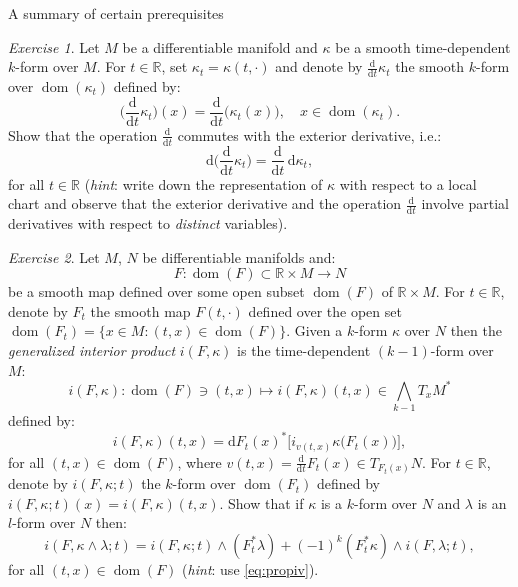 \documentclass[oneside,a4paper,11pt]{amsbook}
\newcommand{\R}{\mathds R}
\newcommand{\dd}{\mathrm d}
\DeclareMathOperator{\Dom}{dom}
\theoremstyle{remark}\newtheorem{exercise}{Exercise}[chapter]
\theoremstyle{plain}\newtheorem{teo}{Theorem}[section]
\theoremstyle{plain}\newtheorem{lem}[teo]{Lemma}
\theoremstyle{plain}\newtheorem{prop}[teo]{Proposition}
\theoremstyle{plain}\newtheorem{cor}[teo]{Corollary}
\theoremstyle{definition}\newtheorem{defin}[teo]{Definition}
\theoremstyle{remark}\newtheorem{rem}[teo]{Remark}
\theoremstyle{definition}\newtheorem{notation}[teo]{Notation}
\theoremstyle{definition}\newtheorem{convention}[teo]{Convention}
\theoremstyle{definition}\newtheorem{example}[teo]{Example}
\numberwithin{section}{chapter}
\numberwithin{equation}{section}
\begin{document}
\begin{chapter}{A summary of certain prerequisites}
\begin{exercise}\label{exe:timedepdiff}
Let $M$ be a differentiable manifold and $\kappa$ be a smooth time-dependent $k$-form over $M$. For $t\in\R$, set $\kappa_t=\kappa(t,\cdot)$
and denote by $\frac{\dd}{\dd t}\kappa_t$ the smooth $k$-form over $\Dom(\kappa_t)$ defined by:
\[\Big(\frac{\dd}{\dd t}\kappa_t\Big)(x)=\frac{\dd}{\dd t}\big(\kappa_t(x)\big),\quad x\in\Dom(\kappa_t).\]
Show that the operation $\frac{\dd}{\dd t}$ commutes with the exterior derivative, i.e.:
\[\dd\Big(\frac{\dd}{\dd t}\kappa_t\Big)=\frac{\dd}{\dd t}\,\dd\kappa_t,\]
for all $t\in\R$ ({\em hint}: write down the representation of $\kappa$ with respect to a local chart and observe
that the exterior derivative and the operation $\frac{\dd}{\dd t}$ involve partial derivatives with respect to {\em distinct\/}
variables).
\end{exercise}

\begin{exercise}\label{exe:genintprod}
Let $M$, $N$ be differentiable manifolds and:
\[F:\Dom(F)\subset\R\times M\longrightarrow N\]
be a smooth map defined over some open subset $\Dom(F)$ of $\R\times M$. For $t\in\R$, denote by $F_t$ the smooth map
$F(t,\cdot)$ defined over the open set $\Dom(F_t)=\big\{x\in M:(t,x)\in\Dom(F)\big\}$.
Given a $k$-form $\kappa$ over $N$ then the
{\em generalized interior product\/} $i(F,\kappa)$ is the time-dependent $(k-1)$-form over $M$:
\[i(F,\kappa):\Dom(F)\ni(t,x)\longmapsto i(F,\kappa)(t,x)\in\bigwedge_{k-1}T_xM^*\]
defined by:
\[i(F,\kappa)(t,x)=\dd F_t(x)^*\big[i_{v(t,x)}\kappa\big(F_t(x)\big)\big],\]
for all $(t,x)\in\Dom(F)$, where $v(t,x)=\frac{\dd}{\dd t}F_t(x)\in T_{F_t(x)}N$. For $t\in\R$, denote by
$i(F,\kappa;t)$ the $k$-form over $\Dom(F_t)$ defined by $i(F,\kappa;t)(x)=i(F,\kappa)(t,x)$.
Show that if $\kappa$ is a $k$-form over $N$ and $\lambda$ is an $l$-form over $N$ then:
\begin{equation}\label{eq:geniderivation}
i(F,\kappa\wedge\lambda;t)=i(F,\kappa;t)\wedge(F_t^*\lambda)+(-1)^k(F_t^*\kappa)\wedge i(F,\lambda;t),
\end{equation}
for all $(t,x)\in\Dom(F)$ ({\em hint}: use \eqref{eq:propiv}).
\end{exercise}


\end{chapter}
\end{document}
